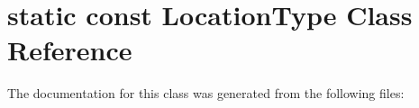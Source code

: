 \hypertarget{classstatic_01const_01LocationType}{}\section{static const Location\+Type Class Reference}
\label{classstatic_01const_01LocationType}


The documentation for this class was generated from the following files\+: